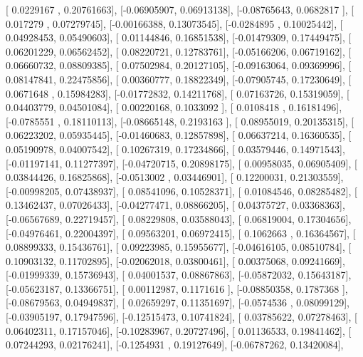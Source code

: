 \documentclass{article}
\begin{document}
       [ 0.0229167 ,  0.20761663],
       [-0.06905907,  0.06913138],
       [-0.08765643,  0.0682817 ],
       [ 0.017279  ,  0.07279745],
       [-0.00166388,  0.13073545],
       [-0.0284895 ,  0.10025442],
       [ 0.04928453,  0.05490603],
       [ 0.01144846,  0.16851538],
       [-0.01479309,  0.17449475],
       [ 0.06201229,  0.06562452],
       [ 0.08220721,  0.12783761],
       [-0.05166206,  0.06719162],
       [ 0.06660732,  0.08809385],
       [ 0.07502984,  0.20127105],
       [-0.09163064,  0.09369996],
       [ 0.08147841,  0.22475856],
       [ 0.00360777,  0.18822349],
       [-0.07905745,  0.17230649],
       [ 0.0671648 ,  0.15984283],
       [-0.01772832,  0.14211768],
       [ 0.07163726,  0.15319059],
       [ 0.04403779,  0.04501084],
       [ 0.00220168,  0.1033092 ],
       [ 0.0108418 ,  0.16181496],
       [-0.0785551 ,  0.18110113],
       [-0.08665148,  0.2193163 ],
       [ 0.08955019,  0.20135315],
       [ 0.06223202,  0.05935445],
       [-0.01460683,  0.12857898],
       [ 0.06637214,  0.16360535],
       [ 0.05190978,  0.04007542],
       [ 0.10267319,  0.17234866],
       [ 0.03579446,  0.14971543],
       [-0.01197141,  0.11277397],
       [-0.04720715,  0.20898175],
       [ 0.00958035,  0.06905409],
       [ 0.03844426,  0.16825868],
       [-0.0513002 ,  0.03446901],
       [ 0.12200031,  0.21303559],
       [-0.00998205,  0.07438937],
       [ 0.08541096,  0.10528371],
       [ 0.01084546,  0.08285482],
       [ 0.13462437,  0.07026433],
       [-0.04277471,  0.08866205],
       [ 0.04375727,  0.03368363],
       [-0.06567689,  0.22719457],
       [ 0.08229808,  0.03588043],
       [ 0.06819004,  0.17304656],
       [-0.04976461,  0.22004397],
       [ 0.09563201,  0.06972415],
       [ 0.1062663 ,  0.16364567],
       [ 0.08899333,  0.15436761],
       [ 0.09223985,  0.15955677],
       [-0.04616105,  0.08510784],
       [ 0.10903132,  0.11702895],
       [-0.02062018,  0.03800461],
       [ 0.00375068,  0.09241669],
       [-0.01999339,  0.15736943],
       [ 0.04001537,  0.08867863],
       [-0.05872032,  0.15643187],
       [-0.05623187,  0.13366751],
       [ 0.00112987,  0.1171616 ],
       [-0.08850358,  0.1787368 ],
       [-0.08679563,  0.04949837],
       [ 0.02659297,  0.11351697],
       [-0.0574536 ,  0.08099129],
       [-0.03905197,  0.17947596],
       [-0.12515473,  0.10741824],
       [ 0.03785622,  0.07278463],
       [ 0.06402311,  0.17157046],
       [-0.10283967,  0.20727496],
       [ 0.01136533,  0.19841462],
       [ 0.07244293,  0.02176241],
       [-0.1254931 ,  0.19127649],
       [-0.06787262,  0.13420084],
\end{document}
